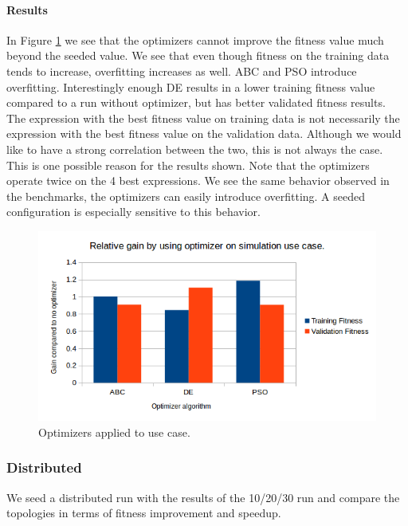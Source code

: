 \paragraph{Results}
In Figure \ref{fig:usecaseoptimizers} we see that the optimizers cannot improve the fitness value much beyond the seeded value. We see that even though fitness on the training data tends to increase, overfitting increases as well. ABC and PSO introduce overfitting. Interestingly enough DE results in a lower training fitness value compared to a run without optimizer, but has better validated fitness results. The expression with the best fitness value on training data is not necessarily the expression with the best fitness value on the validation data. Although we would like to have a strong correlation between the two, this is not always the case. This is one possible reason for the results shown. Note that the optimizers operate twice on the 4 best expressions. We see the same behavior observed in the benchmarks, the optimizers can easily introduce overfitting. A seeded configuration is especially sensitive to this behavior.
\begin{figure}
    \centering
    \includegraphics[width=\textwidth,height=\textheight,keepaspectratio]{figures/usecaseoptimizers.png}
    \caption{Optimizers applied to use case.}
    \label{fig:usecaseoptimizers}
\end{figure}

\subsubsection{Distributed}
We seed a distributed run with the results of the 10/20/30 run and compare the topologies in terms of fitness improvement and speedup.
